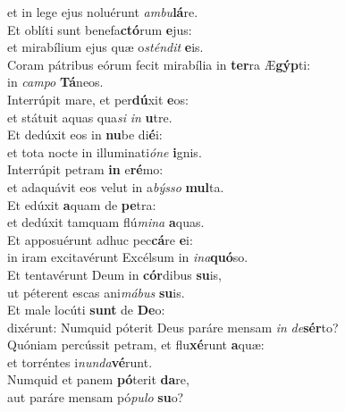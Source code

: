 \oddverse et in lege ejus noluérunt \textit{am}\textit{bu}\textbf{lá}re.\\
\evenverse Et oblíti sunt benefa\textbf{ctó}rum \textbf{e}jus:~\*\\
\evenverse et mirabílium ejus quæ o\textit{stén}\textit{dit} \textbf{e}is.\\
\oddverse Coram pátribus eórum fecit mirabília in \textbf{ter}ra Æ\textbf{gýp}ti:~\*\\
\oddverse in \textit{cam}\textit{po} \textbf{Tá}neos.\\
\evenverse Interrúpit mare, et per\textbf{dú}xit \textbf{e}os:~\*\\
\evenverse et státuit aquas qua\textit{si} \textit{in} \textbf{u}tre.\\
\oddverse Et dedúxit eos in \textbf{nu}be di\textbf{é}i:~\*\\
\oddverse et tota nocte in illuminati\textit{ó}\textit{ne} \textbf{i}gnis.\\
\evenverse Interrúpit petram \textbf{in} e\textbf{ré}mo:~\*\\
\evenverse et adaquávit eos velut in a\textit{býs}\textit{so} \textbf{mul}ta.\\
\oddverse Et edúxit \textbf{a}quam de \textbf{pe}tra:~\*\\
\oddverse et dedúxit tamquam flú\textit{mi}\textit{na} \textbf{a}quas.\\
\evenverse Et apposuérunt adhuc pec\textbf{cá}re \textbf{e}i:~\*\\
\evenverse in iram excitavérunt Excélsum in \textit{i}\textit{na}\textbf{quó}so.\\
\oddverse Et tentavérunt Deum in \textbf{cór}dibus \textbf{su}is,~\*\\
\oddverse ut péterent escas ani\textit{má}\textit{bus} \textbf{su}is.\\
\evenverse Et male locúti \textbf{sunt} de \textbf{De}o:~\*\\
\evenverse dixérunt: Numquid póterit Deus paráre mensam \textit{in} \textit{de}\textbf{sér}to?\\
\oddverse Quóniam percússit petram, et flu\textbf{xé}runt \textbf{a}quæ:~\*\\
\oddverse et torréntes i\textit{nun}\textit{da}\textbf{vé}runt.\\
\evenverse Numquid et panem \textbf{pó}terit \textbf{da}re,~\*\\
\evenverse aut paráre mensam pó\textit{pu}\textit{lo} \textbf{su}o?\\
